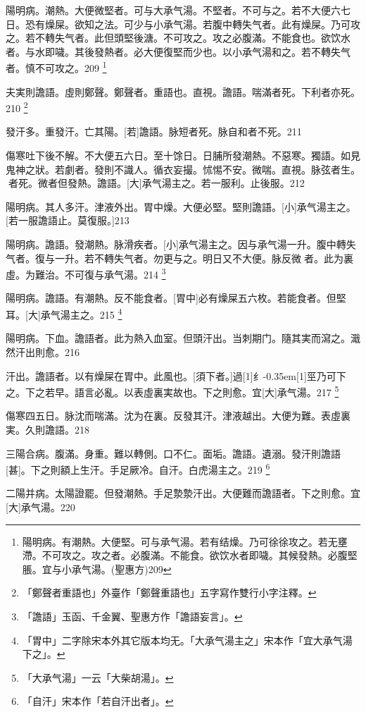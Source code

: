 \documentclass[oneside,b4paper]{ctexbook}
\begin{document}
\begin{flushleft}
陽明病。潮熱。大便微堅者。可与大承气湯。不堅者。不可与之。若不大便六七日。恐有燥屎。欲知之法。可少与小承气湯。若腹中轉失气者。此有燥屎。乃可攻之。若不轉失气者。此但頭堅後溏。不可攻之。攻之必腹滿。不能食也。欲饮水者。与水即噦。其後發熱者。必大便復堅而少也。以小承气湯和之。若不轉失气者。慎不可攻之。209
\footnote{陽明病。有潮熱。大便堅。可与承气湯。若有结燥。乃可徐徐攻之。若无壅滯。不可攻之。攻之者。必腹滿。不能食。欲饮水者即噦。其候發熱。必腹堅脹。宜与小承气湯。(聖惠方)209}

夫実則譫語。虛則鄭聲。鄭聲者。重語也。直視。譫語。喘滿者死。下利者亦死。210
\footnote{「鄭聲者重語也」外臺作「鄭聲重語也」五字寫作雙行小字注釋。}

發汗多。重發汗。亡其陽。[若]譫語。脉短者死。脉自和者不死。211

傷寒吐下後不解。不大便五六日。至十馀日。日脯所發潮熱。不惡寒。獨語。如見鬼神之狀。若劇者。發則不識人。循衣妄撮。怵惕不安。微喘。直視。脉弦者生。{𬈧}者死。微者但發熱。譫語。[大]承气湯主之。若一服利。止後服。212

陽明病。其人多汗。津液外出。胃中燥。大便必堅。堅則譫語。[小]承气湯主之。[若一服譫語止。莫復服。]213

陽明病。譫語。發潮熱。脉滑疾者。[小]承气湯主之。因与承气湯一升。腹中轉失气者。復与一升。若不轉失气者。勿更与之。明日又不大便。脉反微{𬈧}者。此为裏虛。为難治。不可復与承气湯。214
\footnote{「譫語」玉函、千金翼、聖惠方作「譫語妄言」。}

陽明病。譫語。有潮熱。反不能食者。[胃中]必有燥屎五六枚。若能食者。但堅耳。[大]承气湯主之。215
\footnote{「胃中」二字除宋本外其它版本均无。「大承气湯主之」宋本作「宜大承气湯下之」。}

陽明病。下血。譫語者。此为熱入血室。但頭汗出。当刺期门。隨其実而瀉之。濈然汗出則愈。216

汗出。譫語者。以有燥屎在胃中。此風也。[須下者。]過{\hbox{\scalebox{0.68}[1]{纟}\kern-0.35em\scalebox{0.64}[1]{巠}}}乃可下之。下之若早。語言必亂。以表虛裏実故也。下之則愈。宜[大]承气湯。217
\footnote{「大承气湯」一云「大柴胡湯」。}

傷寒四五日。脉沈而喘滿。沈为在裏。反發其汗。津液越出。大便为難。表虛裏実。久則譫語。218

三陽合病。腹滿。身重。難以轉側。口不仁。面垢。譫語。遺溺。發汗則譫語[甚]。下之則額上生汗。手足厥冷。自汗。白虎湯主之。219
\footnote{「自汗」宋本作「若自汗出者」。}

二陽并病。太陽證罷。但發潮熱。手足漐漐汗出。大便難而譫語者。下之則愈。宜[大]承气湯。220


\end{flushleft}
\end{document}
